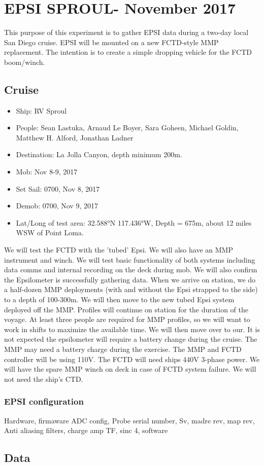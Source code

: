 \chapter{EPSI SPROUL- November 2017}
This purpose of this experiment is to gather EPSI data during a two-day local San Diego cruise.  EPSI will be mounted on a new FCTD-style MMP replacement.  The intention is to create a simple dropping vehicle for the FCTD boom/winch.  

\section{Cruise}
\begin{itemize}
    \item Ship: RV Sproul 
    \item People:  Sean Lastuka, Arnaud Le Boyer, Sara Goheen, Michael Goldin, Matthew H. Alford, Jonathan Ladner
    \item Destination:  La Jolla Canyon, depth minimum 200m.  
    \item Mob:  Nov 8-9, 2017
    \item Set Sail:  0700, Nov 8, 2017
    \item Demob:  0700, Nov 9, 2017
    \item Lat/Long of test area:  32.588°N 117.436°W, Depth = 675m, about 12 miles WSW of Point Loma. 
\end{itemize}

We will test the FCTD with the 'tubed' Epsi. We will also have an MMP instrument and winch.  We will test basic functionality of both systems including data comms and internal recording on the deck during mob.  We will also confirm the Epsilometer is successfully gathering data. When we arrive on station, we do a half-dozen MMP deployments (with and without the Epsi strapped to the side) to a depth of 100-300m.  We will then move to the new tubed Epsi system deployed off the MMP. Profiles will continue on station for the duration of the voyage.  At least three people are required for MMP profiles, so we will want to work in shifts to maximize the available time.  We will then move over to our. It is not expected the epsilometer will require a battery change during the cruise.  The MMP may need a battery charge during the exercise. The MMP and FCTD controller will be using 110V.  The FCTD will need ships 440V 3-phase power. We will have the spare MMP winch on deck in case of FCTD system failure.  We will not need the ship's CTD.


\subsection{EPSI configuration}
Hardware, firmaware
ADC config, Probe serial number, Sv, madre rev, map rev, Anti aliasing filters, charge amp TF, sinc 4, software


\section{Data}

